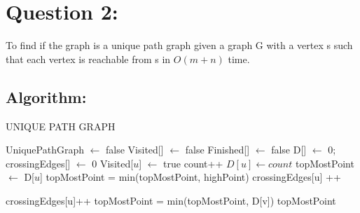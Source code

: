 \documentclass{article}
\let\oldReturn\Return
\renewcommand{\Return}{\State\oldReturn}
\begin{document}
\newpage
\section{Question 2:}
To find if the graph is a unique path graph given a graph G with a vertex s such that each vertex is reachable from s in $O(m+n)$ time.

\subsection{Algorithm:}

\begin{algorithm}[!ht]
	\caption{\uppercase{Unique Path Graph}}
	
	\begin{algorithmic}[1]
		\State UniquePathGraph $\gets$ false
		\State Visited[] $\gets$ false
		\State Finished[] $\gets$ false
		\State %
		D[] $\gets$ 0;
		\State crossingEdges[] $\gets$ 0
		\State Visited[$u$] $\gets$ true
		\State count++
		\State $D[u] \gets count$
		\State topMostPoint $\gets$ D[$u$]
				\State topMostPoint = min(topMostPoint, highPoint)
				 
					\State crossingEdges[u] ++
						\Return
					\EndIf
				\EndIf
				
			\Else 
				 
					\Return
				\Else
					\State crossingEdges[u]++ 
					\State {}
						\Return
					\EndIf
					\State topMostPoint = min(topMostPoint, D[v])
				\EndIf
			\EndIf
		\EndFor
		\State{Finished[$u$] $\gets$ true;}
		\Return topMostPoint
		\EndProcedure
	\end{algorithmic}
\end{algorithm}
\newpage
\end{document}
